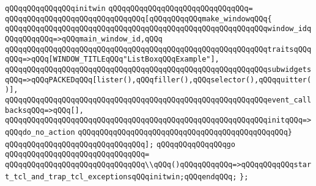 \newline
\verb|qQQqqQQqqQQqqQQqinitwin|\newline
\verb|qQQqqQQqqQQqqQQqqQQqqQQqqQQqqQQq=|\newline
\verb|qQQqqQQqqQQqqQQqqQQqqQQqqQQqqQQq[qQQqqQQqqQQqmake_windowqQQq{|\newline
\verb|qQQqqQQqqQQqqQQqqQQqqQQqqQQqqQQqqQQqqQQqqQQqqQQqqQQqqQQqqQQqwindow_idqQQqqQQqqQQq=>qQQqmain_window_id,qQQq|\newline
\verb|qQQqqQQqqQQqqQQqqQQqqQQqqQQqqQQqqQQqqQQqqQQqqQQqqQQqqQQqqQQqtraitsqQQqqQQq=>qQQq[WINDOW_TITLEqQQq"ListBoxqQQqExample"],|\newline
\verb|qQQqqQQqqQQqqQQqqQQqqQQqqQQqqQQqqQQqqQQqqQQqqQQqqQQqqQQqqQQqsubwidgetsqQQq=>qQQqPACKEDqQQq[lister(),qQQqfiller(),qQQqselector(),qQQqquitter()],|\newline
\verb|qQQqqQQqqQQqqQQqqQQqqQQqqQQqqQQqqQQqqQQqqQQqqQQqqQQqqQQqqQQqevent_callbacksqQQq=>qQQq[],|\newline
\verb|qQQqqQQqqQQqqQQqqQQqqQQqqQQqqQQqqQQqqQQqqQQqqQQqqQQqqQQqqQQqinitqQQq=>qQQqdo_no_action|\newline
\verb|qQQqqQQqqQQqqQQqqQQqqQQqqQQqqQQqqQQqqQQqqQQqqQQq}|\newline
\verb|qQQqqQQqqQQqqQQqqQQqqQQqqQQqqQQq];|\newline
\newline
\verb|qQQqqQQqqQQqqQQqgo|\newline
\verb|qQQqqQQqqQQqqQQqqQQqqQQqqQQqqQQq=|\newline
\verb|qQQqqQQqqQQqqQQqqQQqqQQqqQQqqQQq\\qQQq()qQQqqQQqqQQq=>qQQqqQQqqQQqstart_tcl_and_trap_tcl_exceptionsqQQqinitwin;qQQqendqQQq;|\newline
\newline
\newline
\verb|};|\newline
\newline
\newline
\newline


